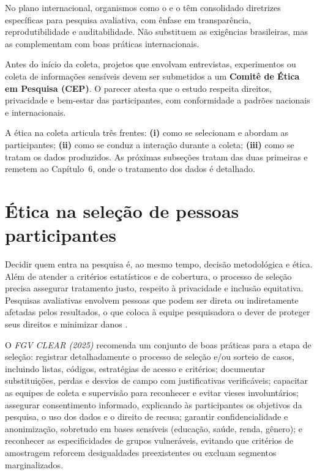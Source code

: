 \documentclass[12pt, a4paper, openany]{book}
\begin{document}
No plano internacional, organismos como o \citet{jpal2020practical} e o \citet{worldbank2021data} t\^em consolidado diretrizes espec\'ificas para pesquisa avaliativa, com \^enfase em transpar\^encia, reprodutibilidade e auditabilidade. N\~ao substituem as exig\^encias brasileiras, mas as complementam com boas pr\'aticas internacionais.

Antes do in\'icio da coleta, projetos que envolvam entrevistas, experimentos ou coleta de informa\c{c}\~oes sens\'iveis devem ser submetidos a um \textbf{Comit\^e de \'Etica em Pesquisa (CEP)}. O parecer atesta que o estudo respeita direitos, privacidade e bem-estar das participantes, com conformidade a padr\~oes nacionais e internacionais.

A \'etica na coleta articula tr\^es frentes: \textbf{(i)} como se selecionam e abordam as participantes; \textbf{(ii)} como se conduz a intera\c{c}\~ao durante a coleta; \textbf{(iii)} como se tratam os dados produzidos. As pr\'oximas subse\c{c}\~oes tratam das duas primeiras e remetem ao Cap\'itulo~6, onde o tratamento dos dados \'e detalhado.

\section{\'Etica na sele\c{c}\~ao de pessoas participantes}

Decidir quem entra na pesquisa \'e, ao mesmo tempo, decis\~ao metodol\'ogica e \'etica. Al\'em de atender a crit\'erios estat\'isticos e de cobertura, o processo de sele\c{c}\~ao precisa assegurar tratamento justo, respeito \`a privacidade e inclus\~ao equitativa. Pesquisas avaliativas envolvem pessoas que podem ser direta ou indiretamente afetadas pelos resultados, o que coloca \`a equipe pesquisadora o dever de proteger seus direitos e minimizar danos \citep{fgvclear2025mea}.

O \textit{FGV CLEAR (2025)} recomenda um conjunto de boas pr\'aticas para a etapa de sele\c{c}\~ao: registrar detalhadamente o processo de sele\c{c}\~ao e/ou sorteio de casos, incluindo listas, c\'odigos, estrat\'egias de acesso e crit\'erios; documentar substitui\c{c}\~oes, perdas e desvios de campo com justificativas verific\'aveis; capacitar as equipes de coleta e supervis\~ao para reconhecer e evitar vieses involunt\'arios; assegurar consentimento informado, explicando \`as participantes os objetivos da pesquisa, o uso dos dados e o direito de recusa; garantir confidencialidade e anonimiza\c{c}\~ao, sobretudo em bases sens\'iveis (educa\c{c}\~ao, sa\'ude, renda, g\^enero); e reconhecer as especificidades de grupos vulner\'aveis, evitando que crit\'erios de amostragem reforcem desigualdades preexistentes ou excluam segmentos marginalizados.
\end{document}
